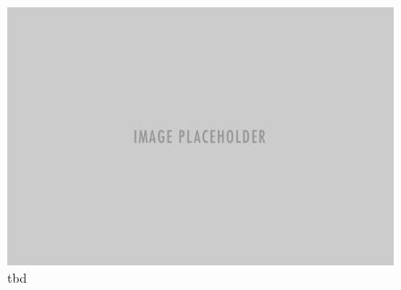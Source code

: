 \begin{figure}[p]
	\centering
	\includegraphics[width=0.8\linewidth]{figures/placeholder.png} 
	\caption[LSTM Encoder-Predictor Model]{tbd} \label{fig:total_model}
\end{figure}



















